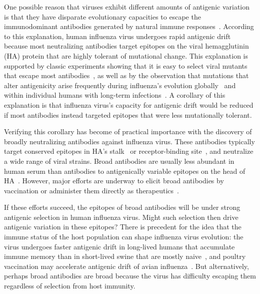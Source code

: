 \documentclass[11pt]{article}
\begin{document}
One possible reason that viruses exhibit different amounts of antigenic variation is that they have disparate evolutionary capacities to escape the immunodominant antibodies generated by natural immune responses~\citep{lipsitch2007patterns,cobey2014pathogen,fulton2015mutational}.
According to this explanation, human influenza virus undergoes rapid antigenic drift because most neutralizing antibodies target epitopes on the viral hemagglutinin (HA) protein that are highly tolerant of mutational change.
This explanation is supported by classic experiments showing that it is easy to select viral mutants that escape most antibodies~\citep{yewdell1979antigenic,webster1980determination}, as well as by the observation that mutations that alter antigenicity arise frequently during influenza's evolution globally~\citep{koel2013substitutions,chambers2015identification,petrie2016antibodies,neher2016prediction} and within individual humans with long-term infections~\citep{xue2017parallel}.
A corollary of this explanation is that influenza virus's capacity for antigenic drift would be reduced if most antibodies instead targeted epitopes that were less mutationally tolerant.

Verifying this corollary has become of practical importance with the discovery of broadly neutralizing antibodies against influenza virus.
These antibodies typically target conserved epitopes in HA's stalk~\citep{sui2009structural,ekiert2009antibody,corti2011neutralizing} or receptor-binding site~\citep{lee2012heterosubtypic,ekiert2012cross,schmidt2015viral}, and neutralize a wide range of viral strains.
Broad antibodies are usually less abundant in human serum than antibodies to antigenically variable epitopes on the head of HA~\citep{ellebedy2014induction,andrews2015immune}.
However, major efforts are underway to elicit broad antibodies by vaccination or administer them directly as therapeutics~\citep{krammer2015advances,corti2017tackling}.

If these efforts succeed, the epitopes of broad antibodies will be under strong antigenic selection in human influenza virus.
Might such selection then drive antigenic variation in these epitopes?
There is precedent for the idea that the immune status of the host population can shape influenza virus evolution: the virus undergoes faster antigenic drift in long-lived humans that accumulate immune memory than in short-lived swine that are mostly naive~\citep{sheerar1989antigenic,luoh1992hemagglutinin}, and poultry vaccination may accelerate antigenic drift of avian influenza~\citep{lee2004effect,cattoli2011antigenic}.
But alternatively, perhaps broad antibodies are broad because the virus has difficulty escaping them regardless of selection from host immunity.
\end{document}
